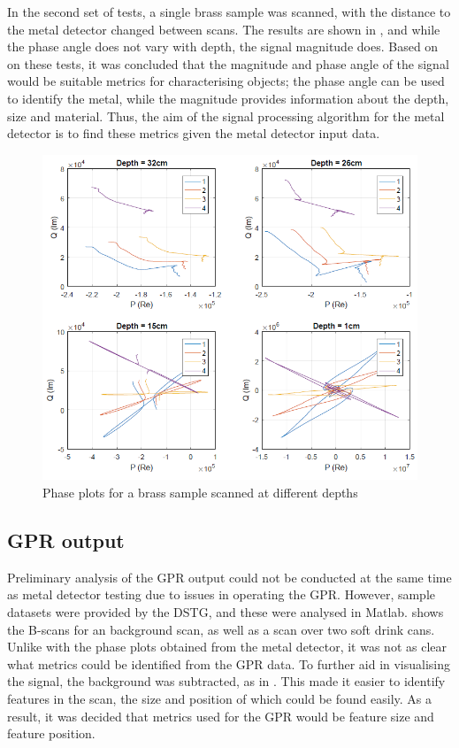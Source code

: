 \documentclass[main.tex]{subfiles}
\begin{document}
In the second set of tests, a single brass sample was scanned, with the distance to the metal detector changed between scans. The results are shown in , and while the phase angle does not vary with depth, the signal magnitude does. Based on on these tests,   it was concluded that the magnitude and phase angle of the signal would be suitable metrics for characterising objects; the phase angle can be used to identify the metal, while the magnitude provides information about the depth, size and material. Thus, the aim of the signal processing algorithm for the metal detector is to find these metrics given the metal detector input data. 

\begin{figure}[htp]
\includegraphics[width=\textwidth]{3-ConceptDesign/phaseDepth.PNG}
\centering
\caption{Phase plots for a brass sample scanned at different depths} 
\end{figure}

\subsection{GPR output}
Preliminary analysis of the GPR output could not be conducted at the same time as metal detector testing due to issues in operating the GPR. However, sample datasets were provided by the DSTG, and these were analysed in Matlab.  shows the B-scans for an background scan, as well as a scan over two soft drink cans. 
Unlike with the phase plots obtained from the metal detector, it was not as clear what metrics could be identified from the GPR data. To further aid in visualising the signal, the background was subtracted, as in . This made it easier to identify features in the scan, the size and position of which could be found easily. As a result, it was decided that metrics used for the GPR would be feature size and feature position.
\end{document}
